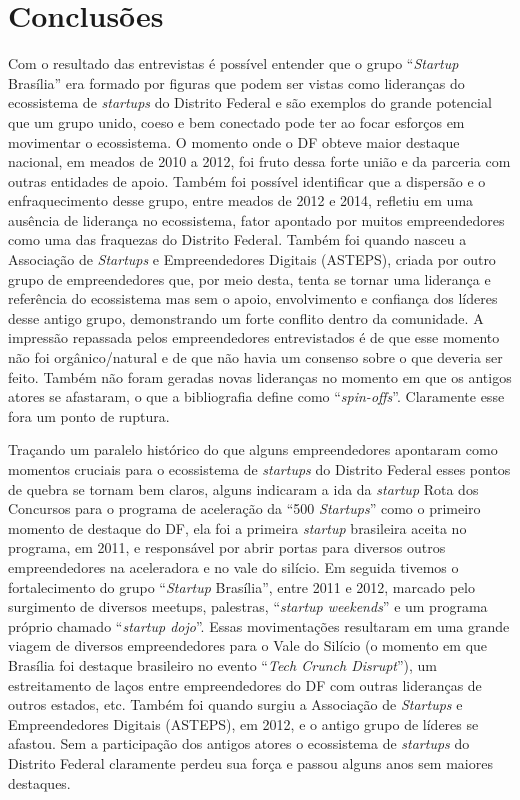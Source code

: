 \chapter[Conclusões]{Conclusões}
\label{cap-conclusoes}

Com o resultado das entrevistas é possível entender que o grupo ``\textit{Startup} Brasília'' era formado por figuras que podem ser vistas como lideranças do ecossistema de \textit{startups} do Distrito Federal e são exemplos do grande potencial que um grupo unido, coeso e bem conectado pode ter ao focar esforços em movimentar o ecossistema. O momento onde o DF obteve maior destaque nacional, em meados de 2010 a 2012, foi fruto dessa forte união e da parceria com outras entidades de apoio. Também foi possível identificar que a dispersão e o enfraquecimento desse grupo, entre meados de 2012 e 2014, refletiu em uma ausência de liderança no ecossistema, fator apontado por muitos empreendedores como uma das fraquezas do Distrito Federal. Também foi quando nasceu a Associação de \textit{Startups} e Empreendedores Digitais (ASTEPS), criada por outro grupo de empreendedores que, por meio desta, tenta se tornar uma liderança e referência do ecossistema mas sem o apoio, envolvimento e confiança dos líderes desse antigo grupo, demonstrando um forte conflito dentro da comunidade. A impressão repassada pelos empreendedores entrevistados é de que esse momento não foi orgânico/natural e de que não havia um consenso sobre o que deveria ser feito. Também não foram geradas novas lideranças no momento em que os antigos atores se afastaram, o que a bibliografia define como ``\textit{spin-offs}''. Claramente esse fora um ponto de ruptura.

Traçando um paralelo histórico do que alguns empreendedores apontaram como momentos cruciais para o ecossistema de \textit{startups} do Distrito Federal esses pontos de quebra se tornam bem claros, alguns indicaram a ida da \textit{startup} Rota dos Concursos para o programa de aceleração da ``500 \textit{Startups}'' como o primeiro momento de destaque do DF, ela foi a primeira \textit{startup} brasileira aceita no programa, em 2011, e responsável por abrir portas para diversos outros empreendedores na aceleradora e no vale do silício. Em seguida tivemos o fortalecimento do grupo ``\textit{Startup} Brasília'', entre 2011 e 2012, marcado pelo surgimento de diversos meetups, palestras, ``\textit{startup weekends}'' e um programa próprio chamado ``\textit{startup dojo}''. Essas movimentações resultaram em uma grande viagem de diversos empreendedores para o Vale do Silício (o momento em que Brasília foi destaque brasileiro no evento ``\textit{Tech Crunch Disrupt}''), um estreitamento de laços entre empreendedores do DF com outras lideranças de outros estados, etc. Também foi quando surgiu a Associação de \textit{Startups} e Empreendedores Digitais (ASTEPS), em 2012, e o antigo grupo de líderes se afastou. Sem a participação dos antigos atores o ecossistema de \textit{startups} do Distrito Federal claramente perdeu sua força e passou alguns anos sem maiores destaques.

